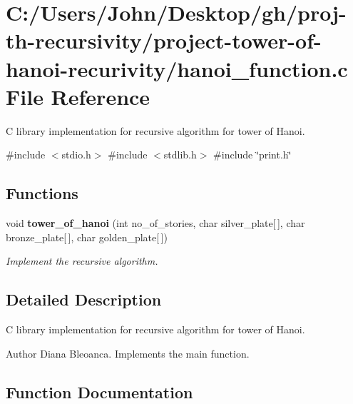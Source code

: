 \section{C\+:/\+Users/\+John/\+Desktop/gh/proj-\/th-\/recursivity/project-\/tower-\/of-\/hanoi-\/recurivity/hanoi\+\_\+function.c File Reference}
\label{hanoi__function_8c}


C library implementation for recursive algorithm for tower of Hanoi.  


{\ttfamily \#include $<$stdio.\+h$>$}\newline
{\ttfamily \#include $<$stdlib.\+h$>$}\newline
{\ttfamily \#include \char`\"{}print.\+h\char`\"{}}\newline
\subsection*{Functions}
\begin{DoxyCompactItemize}
\item 
void \textbf{ tower\+\_\+of\+\_\+hanoi} (int no\+\_\+of\+\_\+stories, char silver\+\_\+plate[$\,$], char bronze\+\_\+plate[$\,$], char golden\+\_\+plate[$\,$])
\begin{DoxyCompactList}\small\item\em Implement the recursive algorithm. \end{DoxyCompactList}\end{DoxyCompactItemize}


\subsection{Detailed Description}
C library implementation for recursive algorithm for tower of Hanoi. 

\begin{DoxyAuthor}{Author}
Diana Bleoanca. Implements the main function. 
\end{DoxyAuthor}


\subsection{Function Documentation}
\mbox{\label{hanoi__function_8c_a931b9d5bea64dd7a0daa829856a010aa}} 
